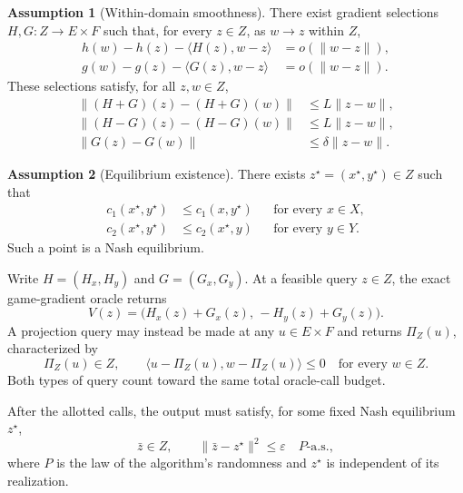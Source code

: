 \documentclass[10pt]{article}
\theoremstyle{definition}
\newtheorem{assumption}{Assumption}
\begin{document}
\begin{assumption}[Within-domain smoothness]
There exist gradient selections $H,G:Z\to E\times F$ such that, for every $z\in Z$, as $w\to z$ within $Z$,
\[
\begin{aligned}
h(w)-h(z)-\langle H(z),w-z\rangle
&=o(\|w-z\|),\\
g(w)-g(z)-\langle G(z),w-z\rangle
&=o(\|w-z\|).
\end{aligned}
\]
These selections satisfy, for all $z,w\in Z$,
\[
\begin{aligned}
\|(H+G)(z)-(H+G)(w)\|&\leq L\|z-w\|,\\
\|(H-G)(z)-(H-G)(w)\|&\leq L\|z-w\|,\\
\|G(z)-G(w)\|&\leq\delta\|z-w\|.
\end{aligned}
\]
\end{assumption}

\begin{assumption}[Equilibrium existence]
There exists $z^\star=(x^\star,y^\star)\in Z$ such that
\[
\begin{aligned}
c_1(x^\star,y^\star)&\leq c_1(x,y^\star)
&&\text{for every }x\in X,\\
c_2(x^\star,y^\star)&\leq c_2(x^\star,y)
&&\text{for every }y\in Y.
\end{aligned}
\]
Such a point is a Nash equilibrium.
\end{assumption}

Write $H=(H_x,H_y)$ and $G=(G_x,G_y)$. At a feasible query $z\in Z$, the exact game-gradient oracle returns
\[
V(z)=\bigl(H_x(z)+G_x(z),\,-H_y(z)+G_y(z)\bigr).
\]
A projection query may instead be made at any $u\in E\times F$ and returns $\Pi_Z(u)$, characterized by
\[
\Pi_Z(u)\in Z,\qquad
\langle u-\Pi_Z(u),w-\Pi_Z(u)\rangle\leq 0
\quad\text{for every }w\in Z.
\]
Both types of query count toward the same total oracle-call budget.

After the allotted calls, the output must satisfy, for some fixed Nash equilibrium $z^\star$,
\[
\bar z\in Z,\qquad
\|\bar z-z^\star\|^2\leq\varepsilon
\quad P\text{-a.s.},
\]
where $P$ is the law of the algorithm's randomness and $z^\star$ is independent of its realization.
\end{document}
